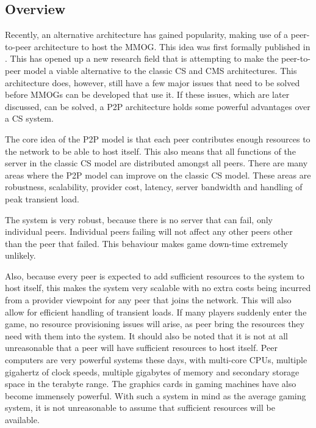 \documentclass[journal,oneside,a4paper,onecolumn]{IEEEtran}
\begin{document}
\subsection{Overview}

Recently, an alternative architecture has gained popularity, making use of a peer-to-peer architecture to host the MMOG. This idea was first formally published in \cite{knutsson_p2p_first}. This has opened up a new research field that is attempting to make the peer-to-peer model a viable alternative to the classic \ac{CS} and \ac{CMS} architectures. This architecture does, however, still have a few major issues that need to be solved before MMOGs can be developed that use it. If these issues, which are later discussed, can be solved, a \ac{P2P} architecture holds some powerful advantages over a \ac{CS} system.

The core idea of the \ac{P2P} model is that each peer contributes enough resources to the network to be able to host itself. This also means that all functions of the server in the classic \ac{CS} model are distributed amongst all peers. There are many areas where the \ac{P2P} model can improve on the classic \ac{CS} model. These areas are robustness, scalability, provider cost, latency, server bandwidth and handling of peak transient load.

The system is very robust, because there is no server that can fail, only individual peers. Individual peers failing will not affect any other peers other than the peer that failed. This behaviour makes game down-time extremely unlikely.

Also, because every peer is expected to add sufficient resources to the system to host itself, this makes the system very scalable with no extra costs being incurred from a provider viewpoint for any peer that joins the network. This will also allow for efficient handling of transient loads. If many players suddenly enter the game, no resource provisioning issues will arise, as peer bring the resources they need with them into the system. It should also be noted that it is not at all unreasonable that a peer will have sufficient resources to host itself. Peer computers are very powerful systems these days, with multi-core CPUs, multiple gigahertz of clock speeds, multiple gigabytes of memory and secondary storage space in the terabyte range. The graphics cards in gaming machines have also become immensely powerful. With such a system in mind as the average gaming system, it is not unreasonable to assume that sufficient resources will be available.
\end{document}
